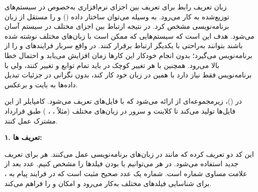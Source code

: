 زبان تعریف رابط  برای تعریف  بین اجزای نرم‌افزاری به‌خصوص در سیستم‌های توزیع‌شده به کار می‌رود. به وسیله  می‌توان ساختار داده () و  را مستقل از زبان برنامه‌نویسی مشخص کرد. در نتیجه ارتباط بین اجزای مختلف در سیستم آسان می‌شود. هدف این است که سیستم‌هایی که ممکن است با زبان‌های مختلف نوشته شده باشند بتوانند به‌راحتی با یکدیگر ارتباط برقرار کنند. در واقع  سربار فرایندهای  و  را از برنامه‌نویس می‌گیرد؛ بدون انجام خودکار این کارها زمان  افزایش می‌یابد و احتمال خطا بالا می‌رود. همچنین با هر تغییر کوچک در  باید تمام توابع  و  تغییر کنند، ولی با  برنامه‌نویس فقط نیاز دارد با همین  در زبان خود کار کند، بدون نگرانی در جزئیات تبدیل داده‌ها به بایت و برعکس.

در  ()، زیرمجموعه‌ای از  ارائه می‌شود که با فایل‌های  تعریف می‌شود. کامپایلر  از این فایل‌ها  تولید می‌کند تا کلاینت و سرور در زبان‌های مختلف (مثلاً ، ، ) طبق قرارداد مشترک عمل کنند.

\bigskip

\noindent
\textbf{۱. تعریف ها:}

این کد دو  تعریف کرده که مانند  در زبان‌های برنامه‌نویسی عمل می‌کنند. هر  برای تعریف  جدید استفاده می‌شود. در هر  می‌توانیم  یا  بودن فیلدها را مشخص کنیم. عدد بعد از علامت مساوی شماره  است. شماره  یک عدد صحیح مثبت است که در فرایند  پیام به ، برای شناسایی فیلدهای مختلف به‌کار می‌رود و امکان  و  را فراهم می‌کند. 

\medskip

